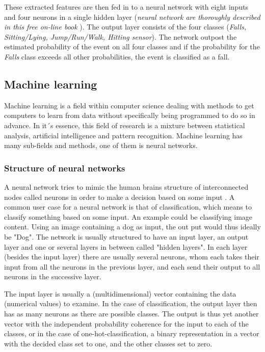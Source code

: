 \documentclass[12pt, a4paper, onecolumn]{article}
\begin{document}
	These extracted features are then fed in to a neural network with eight inputs and four neurons in a single hidden layer (\textit{neural network are thoroughly described in this free on-line book}  \cite{neural_networks}). The output layer consists of the four classes (\textit{Falls, Sitting/Lying, Jump/Run/Walk, Hitting sensor}). The network outpost the estimated probability of the event on all four classes and if the probability for the \textit{Falls}  class exceeds all other probabilities, the event is classified as a fall.
	
	\subsection{Machine learning}
	Machine learning is a field within computer science dealing with methods to get computers to learn from data without specifically being programmed to do so in advance. In it´s essence, this field of research is a mixture between statistical analysis, artificial intelligence and pattern recognition. Machine learning has many sub-fields and methods, one of them is neural networks. 
	
	\subsubsection{Structure of neural networks}
	A neural network tries to mimic the human brains structure of interconnected nodes called neurons in order to make a decision based on some input \cite{mit-neural-netwirks}. A common user case for a neural network is that of classification, which means to classify something based on some input. An example could be classifying image content. Using an image containing a dog as input, the out put would thus ideally be "Dog". The network is usually structured to have an input layer, an output layer and one or several layers in between called "hidden layers". In each layer (besides the input layer) there are usually several neurons, whom each takes their input from all the neurons in the previous layer, and each send their output to all neurons in the successive layer. 
	
	The input layer is usually a (multidimensional) vector containing the data (numerical values) to examine. In the case of classification, the output layer then has as many neurons as there are possible classes. The output is thus yet another vector with the independent probability coherence for the input to each of the classes, or in the case of one-hot-classification, a binary representation in a vector with the decided class set to one, and the other classes set to zero. 
	
\end{document}
